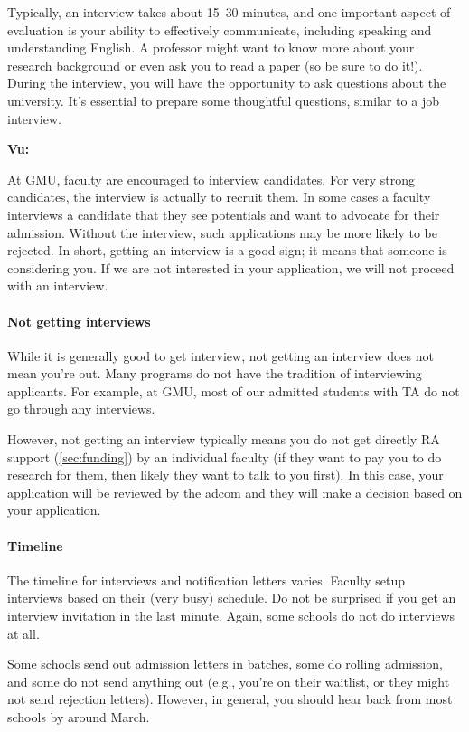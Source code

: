 \documentclass[oneside,11pt]{memoir}
\newenvironment{commentbox}[1][]{
  \small
  \begin{mybox}
    {\small \textbf{#1}}
  }{
  \end{mybox}
}
\begin{document}
Typically, an interview takes about 15--30 minutes, and one important aspect of evaluation is your ability to effectively communicate, including speaking and understanding English. A professor might want to know more about your research background or even ask you to read a paper (so be sure to do it!). During the interview, you will have the opportunity to ask questions about the university. It's essential to prepare some thoughtful questions, similar to a job interview.

\begin{commentbox}[Vu:]
  At GMU, faculty are encouraged to interview candidates. For very strong candidates, the interview is actually to recruit them.  In some cases a faculty interviews a candidate that they see potentials and want to advocate for their admission. Without the interview, such applications may be more likely to be rejected.
  \tcblower
  In short, getting an interview is a good sign; it means that someone is considering you. If we are not interested in your application, we will not proceed with an interview.
\end{commentbox}

\paragraph{Not getting interviews} While it is generally good to get interview, not getting an interview does not mean you're out.  Many programs do not have the tradition of interviewing applicants. For example, at GMU, most of our admitted students with TA do not go through any interviews. 

However, not getting an interview typically means you do not get directly RA support (\autoref{sec:funding}) by an individual faculty (if they want to pay you to do research for them, then likely they want to talk to you first).  In this case, your application will be reviewed by the adcom and they will make a decision based on your application.

\paragraph{Timeline} The timeline for interviews and notification letters varies.  Faculty setup interviews based on their (very busy) schedule. Do not be surprised if you get an interview invitation in the last minute. Again, some schools do not do interviews at all.

Some schools send out admission letters in batches, some do rolling admission, and some do not send anything out (e.g., you're on their waitlist, or they might not send rejection letters).  However, in general, you should hear back from most schools by around March.
\end{document}
